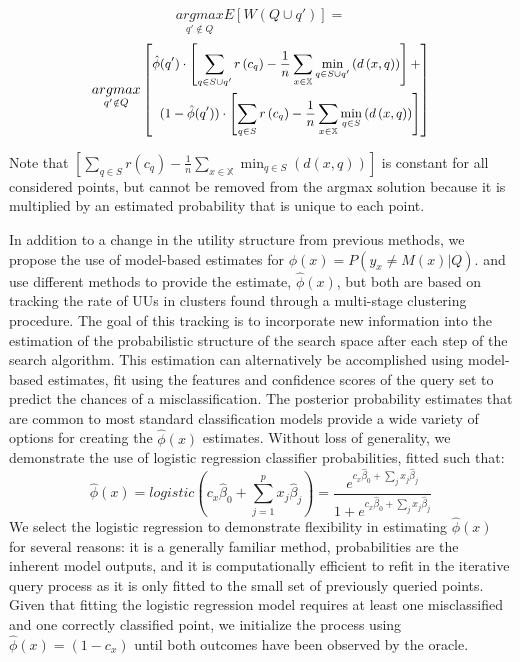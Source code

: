 \documentclass[letterpaper]{article} %
\begin{document}
$$\underset{q' \notin Q}{argmax} E[W(Q \cup q')] = $$
\begin{equation*}
\small
\underset{q' \notin Q}{argmax} \left[\begin{split}
\hat{\phi}(q') \cdot \left[\sum_{q \in S \cup q'} r \left(c_q\right) - \frac{1}{n} \sum_{x \in \mathbb{X}} \min_{q \in S \cup q'}\left(d\left(x,q\right)\right) \right] + \\ 
(1-\hat{\phi}(q')) \cdot \left[\sum_{q \in S} r \left(c_q\right) - \frac{1}{n} \sum_{x \in \mathbb{X}} \min_{q \in S}\left(d\left(x,q\right)\right)\right]  
\end{split}\right]
\end{equation*}
\normalsize

Note that $\left[\sum_{q \in S} r \left(c_q\right) - \frac{1}{n} \sum_{x \in \mathbb{X}} \min_{q \in S}\left(d\left(x,q\right)\right)\right]$ is constant for all considered points, but cannot be removed from the argmax solution because it is multiplied by an estimated probability that is unique to each point. 

In addition to a change in the utility structure from previous methods, we propose the use of model-based estimates for $\phi(x) = P\left(y_x \neq M(x) |Q \right)$. \citet{Lakkaraju2016} and \citet{Bansal2018} use different methods to provide the  estimate, $\hat{\phi}(x)$, but both are based on tracking the rate of UUs in clusters found through a multi-stage clustering procedure. The goal of this tracking is to incorporate new information into the estimation of the probabilistic structure of the search space after each step of the search algorithm. This estimation can alternatively be accomplished using model-based estimates, fit using the features and confidence scores of the query set to predict the chances of a misclassification. The posterior probability estimates that are common to most standard classification models provide a wide variety of options for creating the $\hat{\phi}(x)$ estimates. Without loss of generality, we demonstrate the use of logistic regression classifier probabilities, fitted such that:
$$\hat{\phi}(x) = logistic(c_x\hat{\beta}_0 + \sum_{j=1}^p x_j\hat{\beta}_j) = \frac{e^{c_x\hat{\beta}_0 + \sum_j x_j\hat{\beta}_j}}{1+e^{c_x\hat{\beta}_0 + \sum_j x_j\hat{\beta}_j}}$$
We select the logistic regression to demonstrate flexibility in estimating $\hat{\phi}(x)$ for several reasons: it is a generally familiar method, probabilities are the inherent model outputs, and it is computationally efficient to refit in the iterative query process as it is only fitted to the small set of previously queried points. Given that fitting the logistic regression model requires at least one misclassified and one correctly classified point, we initialize the process using $\hat{\phi}(x) =(1-c_x)$ until both outcomes have been observed by the oracle.
\end{document}
